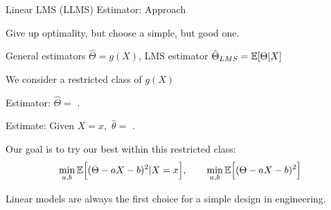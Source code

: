 \begin{frame}{Linear LMS (LLMS) Estimator: Approach}

\plitemsep 0.1in
\bci

\item<2-> Give up optimality, but choose a simple, but good one.

\item<3-> General estimators $\hat{\Theta} = g(X)$, LMS estimator $\hat{\Theta}_{LMS} = \mathbb{E}[ \Theta | X ]$

\item<4-> We consider a restricted class of $g(X)$

  \bci
\item Estimator: $\hat{\Theta} =$ .
\item Estimate: Given $X = x,$ $\hat{\theta} =$ .
  \eci


\item<6-> Our goal is to try our best within this restricted class:
  $$
\min_{a,b} \mathbb{E}\Bigl[ (\Theta - aX -b)^2| X=x \Bigr], \qquad \min_{a,b} \mathbb{E}\Bigl[ (\Theta - aX -b)^2 \Bigr]
$$

\item<7-> Linear models are always the first choice for a simple design in engineering.

\eci


\end{frame}

